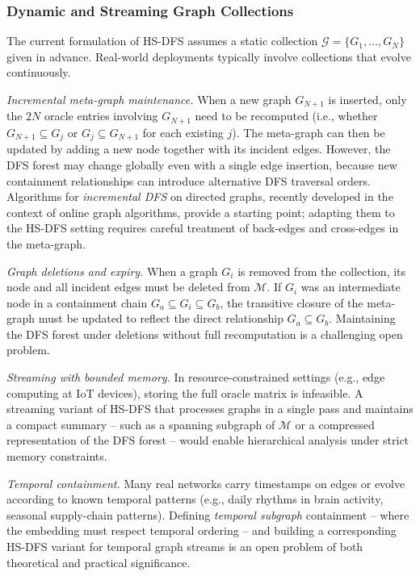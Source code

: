 ﻿\documentclass[12pt,a4paper]{article}
\theoremstyle{plain}
\theoremstyle{definition}
\theoremstyle{remark}
\begin{document}
	\subsubsection*{Dynamic and Streaming Graph Collections}

	The current formulation of HS-DFS assumes a static collection
	$\mathcal{G} = \{G_1, \ldots, G_N\}$ given in advance.  Real-world
	deployments typically involve collections that evolve continuously.

	\emph{Incremental meta-graph maintenance.}  When a new graph $G_{N+1}$ is
	inserted, only the $2N$ oracle entries involving $G_{N+1}$ need to be
	recomputed (i.e., whether $G_{N+1} \subseteq G_j$ or $G_j \subseteq G_{N+1}$
	for each existing $j$).  The meta-graph can then be updated by adding a new
	node together with its incident edges.  However, the DFS forest may change
	globally even with a single edge insertion, because new containment
	relationships can introduce alternative DFS traversal orders.  Algorithms
	for \emph{incremental DFS} on directed graphs, recently developed in the
	context of online graph algorithms, provide a starting point; adapting them
	to the HS-DFS setting requires careful treatment of back-edges and
	cross-edges in the meta-graph.

	\emph{Graph deletions and expiry.}  When a graph $G_i$ is removed from the
	collection, its node and all incident edges must be deleted from
	$\mathcal{M}$.  If $G_i$ was an intermediate node in a containment chain
	$G_a \subseteq G_i \subseteq G_b$, the transitive closure of the
	meta-graph must be updated to reflect the direct relationship
	$G_a \subseteq G_b$.  Maintaining the DFS forest under deletions without
	full recomputation is a challenging open problem.

	\emph{Streaming with bounded memory.}  In resource-constrained settings
	(e.g., edge computing at IoT devices), storing the full oracle matrix is
	infeasible.  A streaming variant of HS-DFS that processes graphs in a
	single pass and maintains a compact summary -- such as a spanning subgraph
	of $\mathcal{M}$ or a compressed representation of the DFS forest -- would
	enable hierarchical analysis under strict memory constraints.

	\emph{Temporal containment.}  Many real networks carry timestamps on edges
	or evolve according to known temporal patterns (e.g., daily rhythms in brain
	activity, seasonal supply-chain patterns).  Defining \emph{temporal subgraph}
	containment -- where the embedding must respect temporal ordering -- and
	building a corresponding HS-DFS variant for temporal graph streams is an
	open problem of both theoretical and practical significance.
\end{document}
